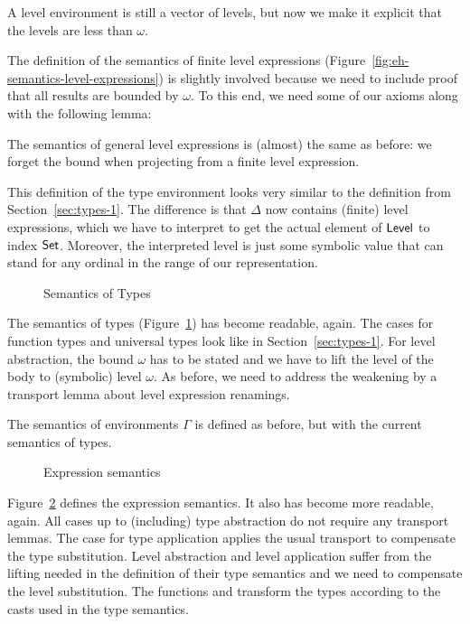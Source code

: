 \documentclass[manuscript,screen,review,anonymous]{acmart}
\begin{document}
{A level environment is still a vector of levels, but now we make it
explicit that the levels are less than $\omega$.

\EHLEnvSem

The definition of the semantics of finite level expressions (Figure~\ref{fig:eh-semantics-level-expressions}) is
slightly involved because we need to include proof that all results
are bounded by $\omega$. To this end, we need some of our axioms along
with the following lemma:
\EHzeroLtomega

The semantics of general level expressions is (almost) the same as
before: we forget the bound when projecting from a finite level
expression. 

\EHFTSEAsFunction

This definition of the type environment looks very similar to the
definition from Section~\ref{sec:types-1}. The difference is that
$\Delta$ now contains (finite) level expressions, which we have to
interpret to get the actual element of $\ALevel$ to index
$\ASet$. Moreover, the interpreted level is just some symbolic value
that can stand for any ordinal in the range of our representation.

\begin{figure}[tp]
  \EHTSem
  \caption{Semantics of Types}
  \label{fig:eh-semantics-types}
\end{figure}
The semantics of types (Figure~\ref{fig:eh-semantics-types}) has
become readable, again. The cases for function types and universal
types look like in Section~\ref{sec:types-1}. For level abstraction,
the bound $\omega$ has to be stated and we have to lift the level of
the body to (symbolic) level $\omega$. As before, we need to address
the weakening by a transport lemma  about level
expression renamings.

The semantics of environments $\Gamma$ is defined as before, but with
the current semantics of types.
\begin{figure}
  \EHESem
  \caption{Expression semantics}
  \label{fig:eh-expression-semantics}
\end{figure}

Figure~\ref{fig:eh-expression-semantics} defines the expression
semantics. It also has become more readable, again. All cases up to
(including) type abstraction do not require any transport lemmas. The
case for type application applies the usual transport to compensate
the type substitution. Level abstraction and level application suffer
from the lifting needed in the definition of their type semantics and
we need to compensate the level substitution. The functions
 and  transform the
types according to the casts used in the type semantics.

}
\end{document}
